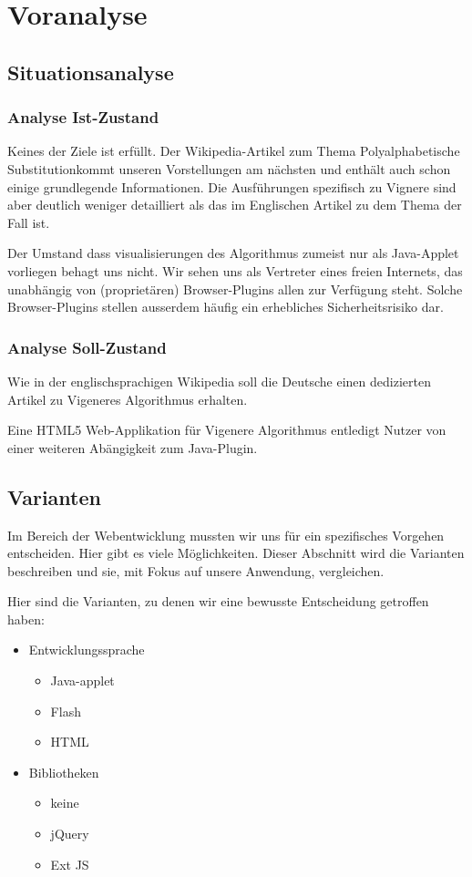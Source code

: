 \documentclass[11pt,paper=a4,final]{scrartcl}
\begin{document}
\section{Voranalyse}
\subsection{Situationsanalyse}
\subsubsection{Analyse Ist-Zustand}
Keines der Ziele ist erf\"ullt. Der Wikipedia-Artikel zum Thema \glqq
Polyalphabetische Substitution\grqq kommt unseren Vorstellungen am n\"achsten
und enth\"alt auch schon einige grundlegende Informationen. Die Ausf\"uhrungen
spezifisch zu Vignere sind aber deutlich weniger detailliert als das im
Englischen Artikel zu dem Thema der Fall ist.

Der Umstand dass visualisierungen des Algorithmus zumeist nur als Java-Applet
vorliegen behagt uns nicht. Wir sehen uns als Vertreter eines \glqq freien\grqq
Internets, das unabh\"angig von (propriet\"aren) Browser-Plugins allen zur
Verf\"ugung steht. Solche Browser-Plugins stellen ausserdem h\"aufig ein
erhebliches Sicherheitsrisiko dar.
\subsubsection{Analyse Soll-Zustand}
Wie in der englischsprachigen Wikipedia soll die Deutsche einen dedizierten
Artikel zu Vigeneres Algorithmus erhalten.

Eine HTML5 Web-Applikation f\"ur Vigenere Algorithmus entledigt Nutzer von einer
weiteren Ab\"angigkeit zum Java-Plugin.
\subsection{Varianten}
Im Bereich der Webentwicklung mussten wir uns f\"ur ein spezifisches Vorgehen
entscheiden. Hier gibt es viele M\"oglichkeiten. Dieser Abschnitt wird die
Varianten beschreiben und sie, mit Fokus auf unsere Anwendung, vergleichen.

Hier sind die Varianten, zu denen wir eine bewusste Entscheidung getroffen
haben:
\begin{itemize}
  \item Entwicklungssprache
  \begin{itemize}
    \item Java-applet
    \item Flash
    \item HTML
  \end{itemize}
  \item Bibliotheken
  \begin{itemize}
    \item keine
    \item jQuery
    \item Ext JS
  \end{itemize}
\end{itemize}
\end{document}
